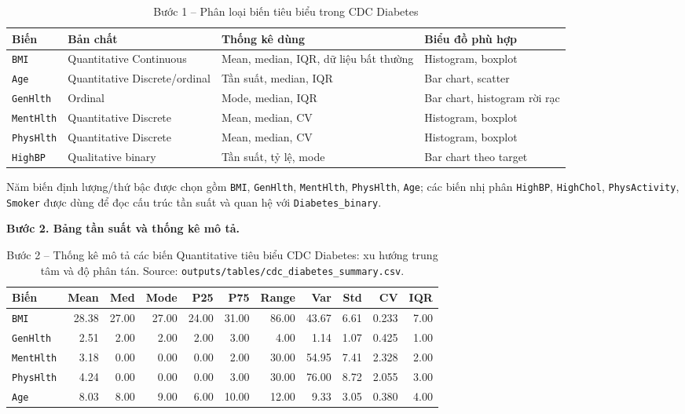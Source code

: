 \begin{table}[H]
\centering
\caption{Bước 1 -- Phân loại biến tiêu biểu trong CDC Diabetes}
\label{tab:ch4_cdc_variable_types}
\small
\begin{tabularx}{\textwidth}{p{}p{}p{}Y}
\toprule
Biến & Bản chất & Thống kê dùng & Biểu đồ phù hợp \\
\midrule
\texttt{BMI} & Quantitative Continuous & Mean, median, IQR, dữ liệu bất thường & Histogram, boxplot \\
\texttt{Age} & Quantitative Discrete/ordinal & Tần suất, median, IQR & Bar chart, scatter \\
\texttt{GenHlth} & Ordinal & Mode, median, IQR & Bar chart, histogram rời rạc \\
\texttt{MentHlth} & Quantitative Discrete & Mean, median, CV & Histogram, boxplot \\
\texttt{PhysHlth} & Quantitative Discrete & Mean, median, CV & Histogram, boxplot \\
\texttt{HighBP} & Qualitative binary & Tần suất, tỷ lệ, mode & Bar chart theo target \\
\bottomrule
\end{tabularx}
\end{table}

Năm biến định lượng/thứ bậc được chọn gồm \texttt{BMI}, \texttt{GenHlth}, \texttt{MentHlth}, \texttt{PhysHlth}, \texttt{Age}; các biến nhị phân \texttt{HighBP}, \texttt{HighChol}, \texttt{PhysActivity}, \texttt{Smoker} được dùng để đọc cấu trúc tần suất và quan hệ với \texttt{Diabetes\_binary}.

\textbf{Bước 2. Bảng tần suất và thống kê mô tả.}

\begin{table}[H]
\centering
\caption[Thống kê mô tả các biến tiêu biểu CDC Diabetes]{Bước 2 -- Thống kê mô tả các biến Quantitative tiêu biểu CDC Diabetes: xu hướng trung tâm và độ phân tán. Source: \texttt{outputs/tables/cdc\_diabetes\_summary.csv}.}
\label{tab:ch4_cdc_stats}
\scriptsize
\setlength{\tabcolsep}{3pt}
\begin{tabular}{lrrrrrrrrrr}
\toprule
Biến & Mean & Med & Mode & P25 & P75 & Range & Var & Std & CV & IQR \\
\midrule
\texttt{BMI} & 28.38 & 27.00 & 27.00 & 24.00 & 31.00 & 86.00 & 43.67 & 6.61 & 0.233 & 7.00 \\
\texttt{GenHlth} & 2.51 & 2.00 & 2.00 & 2.00 & 3.00 & 4.00 & 1.14 & 1.07 & 0.425 & 1.00 \\
\texttt{MentHlth} & 3.18 & 0.00 & 0.00 & 0.00 & 2.00 & 30.00 & 54.95 & 7.41 & 2.328 & 2.00 \\
\texttt{PhysHlth} & 4.24 & 0.00 & 0.00 & 0.00 & 3.00 & 30.00 & 76.00 & 8.72 & 2.055 & 3.00 \\
\texttt{Age} & 8.03 & 8.00 & 9.00 & 6.00 & 10.00 & 12.00 & 9.33 & 3.05 & 0.380 & 4.00 \\
\bottomrule
\end{tabular}
\end{table}


